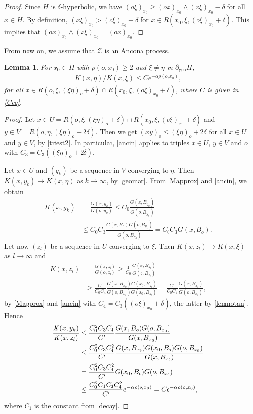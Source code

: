 \documentclass[12pt,a4paper]{amsart}
\newcounter{alph}
\numberwithin{equation}{section}
\newtheorem{lem}[equation]{Lemma}
\theoremstyle{definition}
\DeclareMathOperator{\geo}{geo}
\begin{document}
\begin{proof}
Since $H$ is $\delta$-hyperbolic, we have $(o\xi)_{x_0} \ge (ox)_{x_0}\wedge(x\xi)_{x_0} - \delta$ for all $x\in H$.
By definition, $(x\xi)_{x_0}>(o\xi)_{x_0}+\delta$ for $x\in R(x_0,\xi,(o\xi)_{x_0}+\delta)$.
This implies that $(ox)_{x_0}\wedge(x\xi)_{x_0}=(ox)_{x_0}$.
\end{proof}

From now on, we assume that $\mathcal Z$ is an Ancona process.

\begin{lem}\label{lemdense}
For $x_0\in H$ with $\rho(o,x_0)\geq 2$ and  $\xi\ne\eta$ in $\partial_{\geo}H$,
\begin{align*}
    K(x,\eta)/K(x,\xi) \le C e^{-\alpha\rho(o,x_0)},
\end{align*}
for all $x\in R(o,\xi,(\xi\eta)_o+\delta)\cap R(x_0,\xi,(o\xi)_{x_0}+\delta)$,
where $C$ is given in \eqref{Ceq}.
\end{lem}

\begin{proof}
Let $x\in U = R(o,\xi,(\xi\eta)_o+\delta)\cap R(x_0,\xi,(o\xi)_{x_0}+\delta)$ and $y\in V=R(o,\eta,(\xi\eta)_o+2\delta)$.
Then we get $(xy)_o\leq(\xi\eta)_o+2\delta$ for all $x\in U$ and $y\in V$, by \cref{triest2}.
In particular, \ref{ancin} applies to triples $x\in U$, $y\in V$ and $o$ with $C_3=C_3((\xi\eta)_o+2\delta)$.

Let $x\in U$ and $(y_k)$ be a sequence in $V$ converging to $\eta$.
Then  $K(x,y_k)\to K(x,\eta)$ as $k\to\infty$, by \ref{geomar}.
From \eqref{Mapprox} and \ref{ancin}, we obtain
\begin{align*}
    K(x,y_k) &= \frac{G(x,y_k)}{G(o,y_k)} \le C_0 \frac{G(x,B_{y_k})}{G(o,B_{y_k})} \\
    &\le C_0C_3 \frac{G(x,B_{o})G(o,B_{y_k})}{G(o,B_{y_k})} = C_0C_3G(x,B_{o}).
\end{align*}
Let now $(z_l)$ be a sequence in $U$ converging to $\xi$.
Then $K(x,z_l)\to K(x,\xi)$ as $l\to\infty$ and
\begin{align*}
    K(x,z_l) &= \frac{G(x,z_l)}{G(o,z_l)}
    \ge \frac1{C_0}\frac{G(x,B_{z_l})}{G(o,B_{z_l})} \\
    &\ge \frac{C'}{C_0C_4}\frac{G(x,B_{x_0})G(x_0,B_{z_l})}{G(o,B_{x_0})G(x_0,B_{z_l})}
    = \frac{C'}{C_0C_4}\frac{G(x,B_{x_0})}{G(o,B_{x_0})},
\end{align*}
by \eqref{Mapprox} and \ref{ancin} with $C_4=C_3((o\xi)_{x_0}+\delta)$, the latter by \cref{lemnotan}.
Hence
\begin{align}
    \frac{K(x,y_k)}{K(x,z_l)}
    &\le \frac{C_0^2C_3C_4}{C'}\frac{G(x,B_{o})G(o,B_{x_0})}{G(x,B_{x_0})} \notag \\
    &\le \frac{C_0^2C_3C_4^2}{C'}\frac{G(x,B_{x_0})G(x_0,B_o)G(o,B_{x_0})}{G(x,B_{x_0})} \notag \\
    &= \frac{C_0^2C_3C_4^2}{C'}G(x_0,B_o)G(o,B_{x_0}) \notag \\
    &\le  \frac{C_0^2C_1C_3C_4^2}{C'}e^{-\alpha\rho(o,x_0)}
    = C e^{-\alpha\rho(o,x_0)}, \label{Ceq}
\end{align}
where $C_1$ is the constant from \ref{decay}.
\end{proof}
\end{document}
